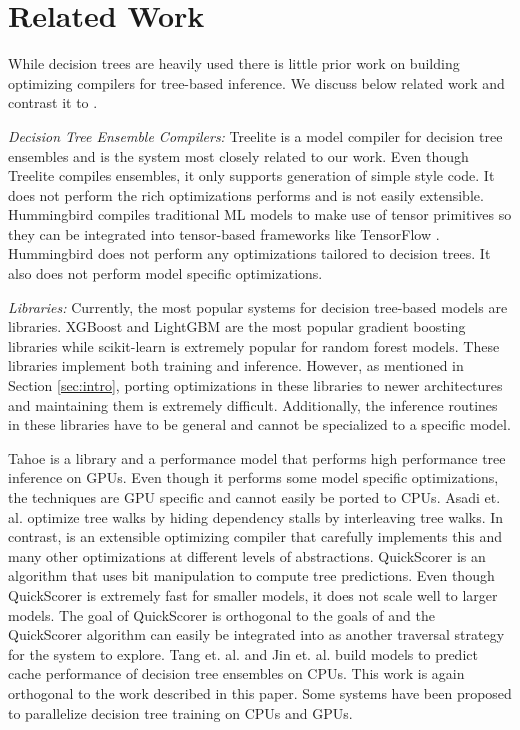 \section{Related Work}
While decision trees are heavily used there is little prior work on building 
optimizing compilers for tree-based inference. We discuss below related work and 
contrast it to \Treebeard{}.

\emph{Decision Tree Ensemble Compilers:}
Treelite\cite{Treelite} is a model compiler for decision tree ensembles and is the system
most closely related to our work. Even though Treelite compiles ensembles, it only supports 
generation of simple  style code. It does not perform the rich 
optimizations \Treebeard{} performs and is not easily extensible.
Hummingbird\cite{Hummingbird} compiles traditional ML models to make use 
of tensor primitives so 
they can be integrated into tensor-based frameworks like TensorFlow \cite{TensorFlow}.
Hummingbird does not perform any optimizations tailored to decision trees. It 
also does not perform model specific optimizations. 

\emph{Libraries:} Currently, the most popular systems for decision tree-based models 
are libraries. XGBoost\cite{XGBoost} and LightGBM\cite{LightGBM} are the most  
popular gradient boosting libraries while scikit-learn\cite{Sklearn} is 
extremely popular for random forest models. These libraries implement both 
training and inference. However, as mentioned in Section \ref{sec:intro}, porting 
optimizations in these libraries to newer architectures and maintaining them is 
extremely difficult. Additionally, the inference routines in these libraries have 
to be general and cannot be specialized to a specific model.

Tahoe\cite{Tahoe} is a library and a performance model that performs high 
performance tree inference on GPUs. Even though it performs some model 
specific optimizations, the techniques are GPU specific and cannot easily 
be ported to CPUs. Asadi et. al.\cite{VPred} optimize tree walks
by hiding dependency stalls by interleaving tree walks. In contrast, \Treebeard{} is an extensible 
optimizing compiler that carefully implements this and many other optimizations at different levels of abstractions.
QuickScorer\cite{QuickScorer, QuickScorer1} is an algorithm that uses 
bit manipulation to compute tree predictions. Even though QuickScorer is 
extremely fast for smaller models, it does not scale well to larger 
models\cite{ProbBasedLayout}. The goal of QuickScorer is orthogonal 
to the goals of \Treebeard{} and the QuickScorer algorithm can easily  
be integrated into \Treebeard{} as another traversal strategy for the 
system to explore. Tang et. al.\cite{CacheConscious1} and Jin et. al.\cite{CacheConscious2}
build models to predict cache performance of decision tree ensembles on CPUs.
This work is again orthogonal to the work described in this paper. Some systems have been proposed 
to parallelize decision tree training on CPUs and GPUs\cite{Jansson2014gpuRFAG, Nasridinov2013DecisionTC}.


